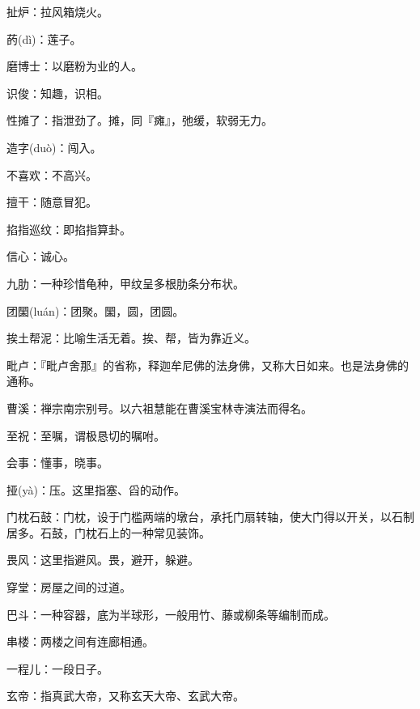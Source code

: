 \startbuffer[1558]
扯炉：拉风箱烧火。
\stopbuffer


\startbuffer[1559]
菂(dì)：莲子。
\stopbuffer


\startbuffer[1560]
磨博士：以磨粉为业的人。
\stopbuffer


\startbuffer[1561]
识俊：知趣，识相。
\stopbuffer


\startbuffer[1562]
性摊了：指泄劲了。摊，同『瘫』，弛缓，软弱无力。
\stopbuffer


\startbuffer[1563]
造字(duò)：闯入。
\stopbuffer


\startbuffer[1564]
不喜欢：不高兴。
\stopbuffer


\startbuffer[1565]
擅干：随意冒犯。
\stopbuffer


\startbuffer[1566]
掐指巡纹：即掐指算卦。
\stopbuffer


\startbuffer[1567]
信心：诚心。
\stopbuffer


\startbuffer[1568]
九肋：一种珍惜龟种，甲纹呈多根肋条分布状。
\stopbuffer


\startbuffer[1569]
团圞(luán)：团聚。圞，圆，团圆。
\stopbuffer


\startbuffer[1570]
挨土帮泥：比喻生活无着。挨、帮，皆为靠近义。
\stopbuffer


\startbuffer[1571]
毗卢：『毗卢舍那』的省称，释迦牟尼佛的法身佛，又称大日如来。也是法身佛的通称。
\stopbuffer


\startbuffer[1572]
曹溪：禅宗南宗别号。以六祖慧能在曹溪宝林寺演法而得名。
\stopbuffer


\startbuffer[1573]
至祝：至嘱，谓极恳切的嘱咐。
\stopbuffer


\startbuffer[1574]
会事：懂事，晓事。
\stopbuffer


\startbuffer[1575]
挜(yà)：压。这里指塞、舀的动作。
\stopbuffer


\startbuffer[1576]
门枕石鼓：门枕，设于门槛两端的墩台，承托门扇转轴，使大门得以开关，以石制居多。石鼓，门枕石上的一种常见装饰。
\stopbuffer


\startbuffer[1577]
畏风：这里指避风。畏，避开，躲避。
\stopbuffer


\startbuffer[1578]
穿堂：房屋之间的过道。
\stopbuffer


\startbuffer[1579]
巴斗：一种容器，底为半球形，一般用竹、藤或柳条等编制而成。
\stopbuffer


\startbuffer[1580]
串楼：两楼之间有连廊相通。
\stopbuffer


\startbuffer[1581]
一程儿：一段日子。
\stopbuffer


\startbuffer[1582]
玄帝：指真武大帝，又称玄天大帝、玄武大帝。
\stopbuffer


